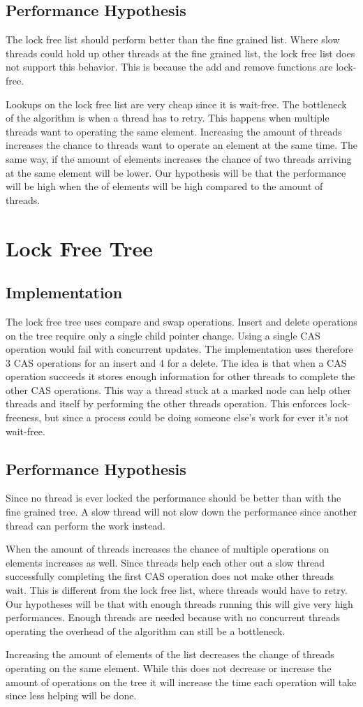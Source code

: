 \documentclass[10pt,a4paper]{article}
\begin{document}
\subsection{Performance Hypothesis}
The lock free list should perform better than the fine grained list. Where slow threads
could hold up other threads at the fine grained list, the lock free list does not support 
this behavior. This is because the add and remove functions are lock-free.

Lookups on the lock free list are very cheap since it is wait-free. The bottleneck of the 
algorithm is when a thread has to retry. This happens when multiple threads want to operating the same element.
Increasing the amount of threads increases the chance to threads want to operate an element at the same time.
The same way, if the amount of elements increases the chance of two threads arriving
at the same element will be lower. Our hypothesis will be that the 
performance will be high when the of elements will be high compared to the
amount of threads.


\section{Lock Free Tree}
\subsection{Implementation}
The lock free tree uses compare and swap operations. Insert and delete
operations on the tree require only a single child pointer change. Using a single CAS operation
would fail with concurrent updates. The implementation uses therefore 3 CAS operations for an insert and
4 for a delete. The idea is that when a CAS operation succeeds it stores enough information
for other threads to complete the other CAS operations. This way a thread stuck at a marked node can help other
threads and itself by performing the other threads operation. This enforces lock-freeness, but since
a process could be doing someone else's work for ever it's not wait-free.

\subsection{Performance Hypothesis}
Since no thread is ever locked the performance should be better than with the fine grained tree. A slow
thread will not slow down the performance since another thread can perform the work instead.

When the amount of threads increases the chance of multiple operations on elements increases as well. Since
threads help each other out a slow thread successfully completing the first CAS operation does not make other
threads wait. This is different from the lock free list, where threads would have to retry. Our hypotheses will be that
with enough threads running this will give very high performances. Enough threads are needed because with no concurrent
threads operating the overhead of the algorithm can still be a bottleneck.

Increasing the amount of elements of the list decreases the change of threads operating on the same element.
While this does not decrease or increase the amount of operations on the tree it will increase the time each
operation will take since less helping will be done.
\end{document}
